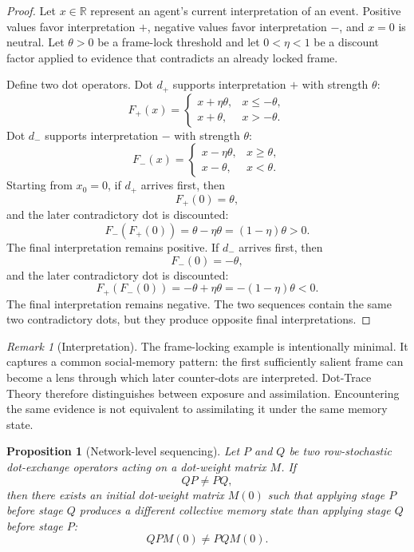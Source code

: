 \documentclass[11pt]{article}
\newtheorem{proposition}{Proposition}
\theoremstyle{remark}
\newtheorem{remark}{Remark}
\begin{document}
\begin{proof}
Let $x\in\mathbb{R}$ represent an agent's current interpretation of an
event. Positive values favor interpretation $+$, negative values favor
interpretation $-$, and $x=0$ is neutral. Let $\theta>0$ be a frame-lock
threshold and let $0<\eta<1$ be a discount factor applied to evidence
that contradicts an already locked frame.

Define two dot operators. Dot $d_+$ supports interpretation $+$ with
strength $\theta$:
$$
F_+(x)=
\begin{cases}
 x+\eta\theta, & x\leq -\theta,\\
 x+\theta, & x> -\theta.
\end{cases}
$$
Dot $d_-$ supports interpretation $-$ with strength $\theta$:
$$
F_-(x)=
\begin{cases}
 x-\eta\theta, & x\geq \theta,\\
 x-\theta, & x< \theta.
\end{cases}
$$
Starting from $x_0=0$, if $d_+$ arrives first, then
$$
F_+(0)=\theta,
$$
and the later contradictory dot is discounted:
$$
F_-(F_+(0))=\theta-\eta\theta=(1-\eta)\theta>0.
$$
The final interpretation remains positive. If $d_-$ arrives first, then
$$
F_-(0)=-\theta,
$$
and the later contradictory dot is discounted:
$$
F_+(F_-(0))=-\theta+\eta\theta=-(1-\eta)\theta<0.
$$
The final interpretation remains negative. The two sequences contain
the same two contradictory dots, but they produce opposite final
interpretations.
\end{proof}

\begin{remark}[Interpretation]
The frame-locking example is intentionally minimal. It captures a common
social-memory pattern: the first sufficiently salient frame can become a
lens through which later counter-dots are interpreted. Dot-Trace Theory
therefore distinguishes between exposure and assimilation. Encountering
the same evidence is not equivalent to assimilating it under the same
memory state.
\end{remark}

\begin{proposition}[Network-level sequencing]\label{prop:network-level-sequencing}
Let $P$ and $Q$ be two row-stochastic dot-exchange operators acting on a
dot-weight matrix $M$. If
$$
QP\neq PQ,
$$
then there exists an initial dot-weight matrix $M(0)$ such that applying
stage $P$ before stage $Q$ produces a different collective memory state
than applying stage $Q$ before stage $P$:
$$
QPM(0)\neq PQM(0).
$$
\end{proposition}
\end{document}
